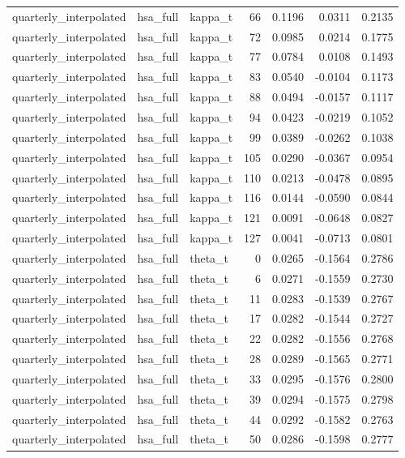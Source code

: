\begin{tabular}{lllrrrr}
quarterly\_interpolated & hsa\_full & kappa\_t & 66 & 0.1196 & 0.0311 & 0.2135 \\
quarterly\_interpolated & hsa\_full & kappa\_t & 72 & 0.0985 & 0.0214 & 0.1775 \\
quarterly\_interpolated & hsa\_full & kappa\_t & 77 & 0.0784 & 0.0108 & 0.1493 \\
quarterly\_interpolated & hsa\_full & kappa\_t & 83 & 0.0540 & -0.0104 & 0.1173 \\
quarterly\_interpolated & hsa\_full & kappa\_t & 88 & 0.0494 & -0.0157 & 0.1117 \\
quarterly\_interpolated & hsa\_full & kappa\_t & 94 & 0.0423 & -0.0219 & 0.1052 \\
quarterly\_interpolated & hsa\_full & kappa\_t & 99 & 0.0389 & -0.0262 & 0.1038 \\
quarterly\_interpolated & hsa\_full & kappa\_t & 105 & 0.0290 & -0.0367 & 0.0954 \\
quarterly\_interpolated & hsa\_full & kappa\_t & 110 & 0.0213 & -0.0478 & 0.0895 \\
quarterly\_interpolated & hsa\_full & kappa\_t & 116 & 0.0144 & -0.0590 & 0.0844 \\
quarterly\_interpolated & hsa\_full & kappa\_t & 121 & 0.0091 & -0.0648 & 0.0827 \\
quarterly\_interpolated & hsa\_full & kappa\_t & 127 & 0.0041 & -0.0713 & 0.0801 \\
quarterly\_interpolated & hsa\_full & theta\_t & 0 & 0.0265 & -0.1564 & 0.2786 \\
quarterly\_interpolated & hsa\_full & theta\_t & 6 & 0.0271 & -0.1559 & 0.2730 \\
quarterly\_interpolated & hsa\_full & theta\_t & 11 & 0.0283 & -0.1539 & 0.2767 \\
quarterly\_interpolated & hsa\_full & theta\_t & 17 & 0.0282 & -0.1544 & 0.2727 \\
quarterly\_interpolated & hsa\_full & theta\_t & 22 & 0.0282 & -0.1556 & 0.2768 \\
quarterly\_interpolated & hsa\_full & theta\_t & 28 & 0.0289 & -0.1565 & 0.2771 \\
quarterly\_interpolated & hsa\_full & theta\_t & 33 & 0.0295 & -0.1576 & 0.2800 \\
quarterly\_interpolated & hsa\_full & theta\_t & 39 & 0.0294 & -0.1575 & 0.2798 \\
quarterly\_interpolated & hsa\_full & theta\_t & 44 & 0.0292 & -0.1582 & 0.2763 \\
quarterly\_interpolated & hsa\_full & theta\_t & 50 & 0.0286 & -0.1598 & 0.2777 \\

\end{tabular}

